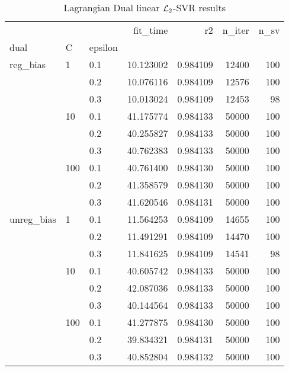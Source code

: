 \begin{table}[H]
\centering
\caption{Lagrangian Dual linear $\protect \mathcal{L}_2$-SVR results}
\label{linear_lagrangian_dual_l2_svr_cv_results}
\begin{tabular}{lllrrrr}
\toprule
           &     &     &   fit\_time &        r2 &  n\_iter &  n\_sv \\
dual & C & epsilon &            &           &         &       \\
\midrule
reg\_bias & 1   & 0.1 &  10.123002 &  0.984109 &   12400 &   100 \\
           &     & 0.2 &  10.076116 &  0.984109 &   12576 &   100 \\
           &     & 0.3 &  10.013024 &  0.984109 &   12453 &    98 \\
           & 10  & 0.1 &  41.175774 &  0.984133 &   50000 &   100 \\
           &     & 0.2 &  40.255827 &  0.984133 &   50000 &   100 \\
           &     & 0.3 &  40.762383 &  0.984133 &   50000 &   100 \\
           & 100 & 0.1 &  40.761400 &  0.984130 &   50000 &   100 \\
           &     & 0.2 &  41.358579 &  0.984130 &   50000 &   100 \\
           &     & 0.3 &  41.620546 &  0.984131 &   50000 &   100 \\
unreg\_bias & 1   & 0.1 &  11.564253 &  0.984109 &   14655 &   100 \\
           &     & 0.2 &  11.491291 &  0.984109 &   14470 &   100 \\
           &     & 0.3 &  11.841625 &  0.984109 &   14541 &    98 \\
           & 10  & 0.1 &  40.605742 &  0.984133 &   50000 &   100 \\
           &     & 0.2 &  42.087036 &  0.984133 &   50000 &   100 \\
           &     & 0.3 &  40.144564 &  0.984133 &   50000 &   100 \\
           & 100 & 0.1 &  41.277875 &  0.984130 &   50000 &   100 \\
           &     & 0.2 &  39.834321 &  0.984131 &   50000 &   100 \\
           &     & 0.3 &  40.852804 &  0.984132 &   50000 &   100 \\
\bottomrule
\end{tabular}
\end{table}
